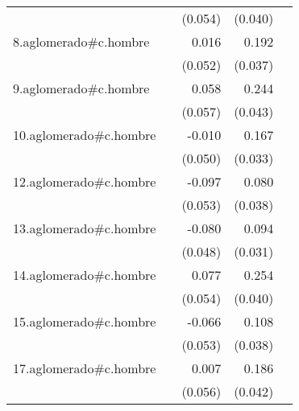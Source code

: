 {\begin{longtable}{l*{4}{D{.}{.}{-1}}}
            &                     &     (0.054)         &     (0.040)         &                     \\
\addlinespace
8.aglomerado#c.hombre&                     &       0.016         &       0.192\sym{***}&                     \\
            &                     &     (0.052)         &     (0.037)         &                     \\
\addlinespace
9.aglomerado#c.hombre&                     &       0.058         &       0.244\sym{***}&                     \\
            &                     &     (0.057)         &     (0.043)         &                     \\
\addlinespace
10.aglomerado#c.hombre&                     &      -0.010         &       0.167\sym{***}&                     \\
            &                     &     (0.050)         &     (0.033)         &                     \\
\addlinespace
12.aglomerado#c.hombre&                     &      -0.097         &       0.080\sym{*}  &                     \\
            &                     &     (0.053)         &     (0.038)         &                     \\
\addlinespace
13.aglomerado#c.hombre&                     &      -0.080         &       0.094\sym{**} &                     \\
            &                     &     (0.048)         &     (0.031)         &                     \\
\addlinespace
14.aglomerado#c.hombre&                     &       0.077         &       0.254\sym{***}&                     \\
            &                     &     (0.054)         &     (0.040)         &                     \\
\addlinespace
15.aglomerado#c.hombre&                     &      -0.066         &       0.108\sym{**} &                     \\
            &                     &     (0.053)         &     (0.038)         &                     \\
\addlinespace
17.aglomerado#c.hombre&                     &       0.007         &       0.186\sym{***}&                     \\
            &                     &     (0.056)         &     (0.042)         &                     \\

\end{longtable}}
